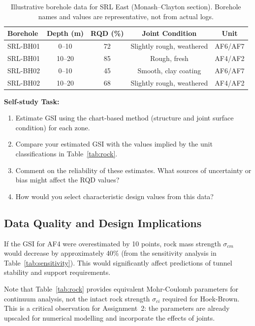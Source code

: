 \documentclass[a4paper,12pt]{article}
\begin{document}
\begin{table}[h!]
\centering
\small
\begin{tabular}{lcccc}
\toprule
\textbf{Borehole} & \textbf{Depth (m)} & \textbf{RQD (\%)} & \textbf{Joint Condition} & \textbf{Unit} \\
\midrule
SRL-BH01 & 0--10 & 72 & Slightly rough, weathered & AF6/AF7 \\
SRL-BH01 & 10--20 & 85 & Rough, fresh & AF4/AF2 \\
SRL-BH02 & 0--10 & 45 & Smooth, clay coating & AF6/AF7 \\
SRL-BH02 & 10--20 & 68 & Slightly rough, weathered & AF4/AF2 \\
\bottomrule
\end{tabular}
\caption{Illustrative borehole data for SRL East (Monash--Clayton section). Borehole names and values are representative, not from actual logs.}
\label{tab:borehole}
\end{table}

\textbf{Self-study Task:}
\begin{enumerate}
    \item Estimate GSI using the chart-based method (structure and joint surface condition) for each zone.
    \item Compare your estimated GSI with the values implied by the unit classifications in Table~\ref{tab:rock}.
    \item Comment on the reliability of these estimates. What sources of uncertainty or bias might affect the RQD values?
    \item How would you select characteristic design values from this data?
\end{enumerate}

\subsection{Data Quality and Design Implications}

\begin{warnbox}
If the GSI for AF4 were overestimated by 10 points, rock mass strength $\sigma_{cm}$ would decrease by approximately 40\% (from the sensitivity analysis in Table~\ref{tab:sensitivity}). This would significantly affect predictions of tunnel stability and support requirements.
\end{warnbox}

Note that Table~\ref{tab:rock} provides equivalent Mohr-Coulomb parameters for continuum analysis, not the intact rock strength $\sigma_{ci}$ required for Hoek-Brown. This is a critical observation for Assignment~2: the parameters are already upscaled for numerical modelling and incorporate the effects of joints.
\end{document}
